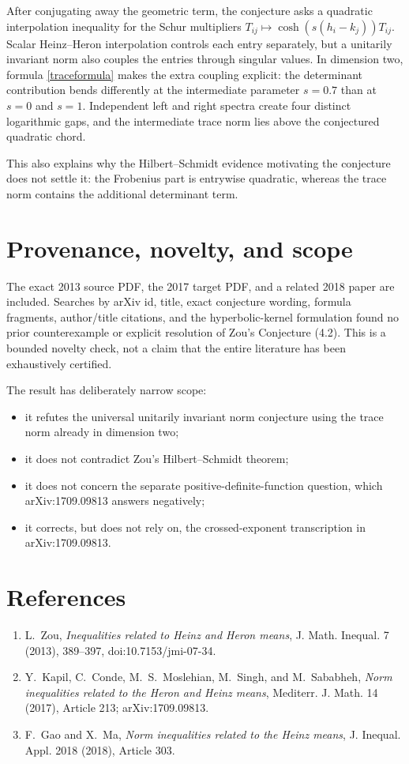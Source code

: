 \documentclass[11pt]{article}
\begin{document}
After conjugating away the geometric term, the conjecture asks a
quadratic interpolation inequality for the Schur multipliers
\(T_{ij}\mapsto\cosh(s(h_i-k_j))T_{ij}\).  Scalar Heinz--Heron
interpolation controls each entry separately, but a unitarily invariant
norm also couples the entries through singular values.  In dimension two,
formula \eqref{traceformula} makes the extra coupling explicit: the
determinant contribution bends differently at the intermediate parameter
\(s=0.7\) than at \(s=0\) and \(s=1\).  Independent left and right spectra
create four distinct logarithmic gaps, and the intermediate trace norm
lies above the conjectured quadratic chord.

This also explains why the Hilbert--Schmidt evidence motivating the
conjecture does not settle it: the Frobenius part is entrywise quadratic,
whereas the trace norm contains the additional determinant term.

\section{Provenance, novelty, and scope}

The exact 2013 source PDF, the 2017 target PDF, and a related 2018 paper
are included.  Searches by arXiv id, title, exact conjecture wording,
formula fragments, author/title citations, and the hyperbolic-kernel
formulation found no prior counterexample or explicit resolution of
Zou's Conjecture (4.2).  This is a bounded novelty check, not a claim that
the entire literature has been exhaustively certified.

The result has deliberately narrow scope:
\begin{itemize}[leftmargin=*]
\item it refutes the universal unitarily invariant norm conjecture using
the trace norm already in dimension two;
\item it does not contradict Zou's Hilbert--Schmidt theorem;
\item it does not concern the separate positive-definite-function question,
which arXiv:1709.09813 answers negatively;
\item it corrects, but does not rely on, the crossed-exponent transcription
in arXiv:1709.09813.
\end{itemize}

\section{References}

\begin{enumerate}[leftmargin=*]
\item L.~Zou, \emph{Inequalities related to Heinz and Heron means},
J. Math. Inequal. 7 (2013), 389--397, doi:10.7153/jmi-07-34.
\item Y.~Kapil, C.~Conde, M.~S.~Moslehian, M.~Singh, and M.~Sababheh,
\emph{Norm inequalities related to the Heron and Heinz means},
Mediterr. J. Math. 14 (2017), Article 213; arXiv:1709.09813.
\item F.~Gao and X.~Ma, \emph{Norm inequalities related to the Heinz
means}, J. Inequal. Appl. 2018 (2018), Article 303.
\end{enumerate}
\end{document}
